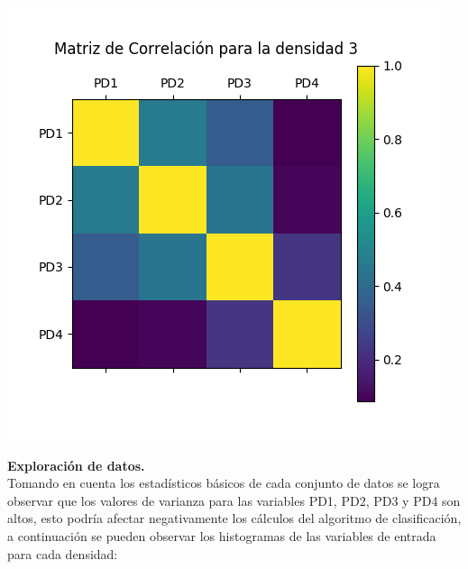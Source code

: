 \includegraphics[scale=0.5]{correlacionD3.jpg} 

\noindent
\textbf{Exploración de datos.}\\
Tomando en cuenta los estadísticos básicos de cada conjunto de datos se logra observar que los valores de varianza para las variables PD1, PD2, PD3 y PD4 son altos, esto podría afectar negativamente los cálculos del algoritmo de clasificación, a continuación se pueden observar los histogramas de las variables de entrada para cada densidad: 

